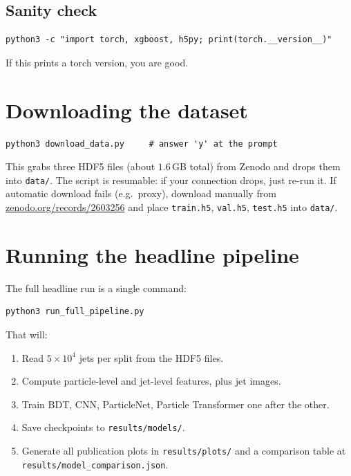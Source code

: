 \documentclass[11pt,a4paper]{article}
\begin{document}
\subsection{Sanity check}
\begin{lstlisting}[style=shell]
python3 -c "import torch, xgboost, h5py; print(torch.__version__)"
\end{lstlisting}

If this prints a torch version, you are good.

\section{Downloading the dataset}\label{sec:download}

\begin{lstlisting}[style=shell]
python3 download_data.py     # answer 'y' at the prompt
\end{lstlisting}

This grabs three HDF5 files (about $1.6$\,GB total) from Zenodo and
drops them into \texttt{data/}. The script is resumable: if your
connection drops, just re-run it. If automatic download fails (e.g.\
proxy), download manually from
\href{https://zenodo.org/records/2603256}{zenodo.org/records/2603256}
and place \texttt{train.h5}, \texttt{val.h5}, \texttt{test.h5} into
\texttt{data/}.

\section{Running the headline pipeline}\label{sec:run}

The full headline run is a single command:
\begin{lstlisting}[style=shell]
python3 run_full_pipeline.py
\end{lstlisting}

That will:
\begin{enumerate}
    \item Read $5\!\times\!10^4$ jets per split from the HDF5 files.
    \item Compute particle-level and jet-level features, plus
          jet images.
    \item Train BDT, CNN, ParticleNet, Particle Transformer one
          after the other.
    \item Save checkpoints to \texttt{results/models/}.
    \item Generate all publication plots in
          \texttt{results/plots/} and a comparison table at
          \texttt{results/model\_comparison.json}.
\end{enumerate}
\end{document}
